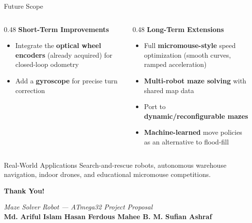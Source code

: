 \documentclass[aspectratio=169,11pt]{beamer}
\newcommand{\highlight}[1]{\textcolor{teal!80!black}{\textbf{#1}}}
\begin{document}
\begin{frame}{Future Scope}
    \small
    \begin{columns}[T]
        \begin{column}{0.48\textwidth}
            \textbf{Short-Term Improvements}
            \begin{itemize}\setlength{\itemsep}{0pt}
                \item Integrate the \highlight{optical wheel encoders} (already acquired) for closed-loop odometry
                \item Add a \highlight{gyroscope} for precise turn correction
            \end{itemize}
        \end{column}
        \begin{column}{0.48\textwidth}
            \textbf{Long-Term Extensions}
            \begin{itemize}\setlength{\itemsep}{0pt}
                \item Full \highlight{micromouse-style} speed optimization (smooth curves, ramped acceleration)
                \item \highlight{Multi-robot maze solving} with shared map data
                \item Port to \highlight{dynamic/reconfigurable mazes}
                \item \highlight{Machine-learned} move policies as an alternative to flood-fill
            \end{itemize}
        \end{column}
    \end{columns}

    \vspace{0.2cm}
    \begin{alertblock}{Real-World Applications}
        Search-and-rescue robots, autonomous warehouse navigation, indoor drones, and educational micromouse competitions.
    \end{alertblock}
\end{frame}

\begin{frame}
    \begin{center}
        \Huge\textbf{Thank You!}

        \vspace{1.5cm}
        \normalsize
        \textit{Maze Solver Robot --- ATmega32 Project Proposal}\\[5pt]
        \textbf{Md. Ariful Islam \quad Hasan Ferdous Mahee \quad B. M. Sufian Ashraf}
    \end{center}
\end{frame}

\end{document}
